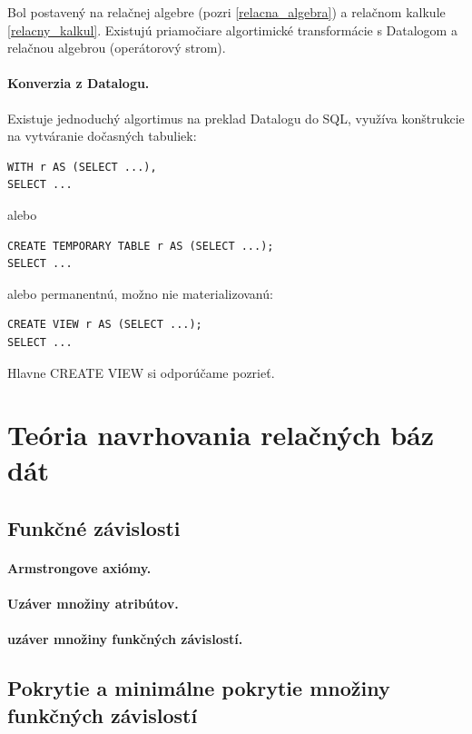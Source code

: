 \documentclass[10pt,a4paper]{article}
\begin{document}
Bol postavený na relačnej algebre (pozri \ref{relacna_algebra}) a relačnom kalkule \ref{relacny_kalkul}. Existujú priamočiare algortimické transformácie s Datalogom a relačnou algebrou (operátorový strom). 
 
\paragraph{Konverzia z Datalogu.}
Existuje jednoduchý algortimus na preklad Datalogu do SQL,
využíva konštrukcie na vytváranie dočasných tabuliek: 
\begin{verbatim}
WITH r AS (SELECT ...),
SELECT ...
\end{verbatim} 
alebo
\begin{verbatim}
CREATE TEMPORARY TABLE r AS (SELECT ...);
SELECT ...
\end{verbatim}
alebo permanentnú, možno nie materializovanú: 
\begin{verbatim}
CREATE VIEW r AS (SELECT ...);
SELECT ...
\end{verbatim}

Hlavne CREATE VIEW si odporúčame pozrieť. 

\section{Teória navrhovania relačných báz dát} 

\subsection{Funkčné závislosti}
\paragraph{Armstrongove axiómy.} 
\paragraph{Uzáver množiny atribútov.}
\paragraph{uzáver množiny funkčných závislostí.}

\subsection{Pokrytie a minimálne pokrytie množiny funkčných závislostí}
\end{document}
